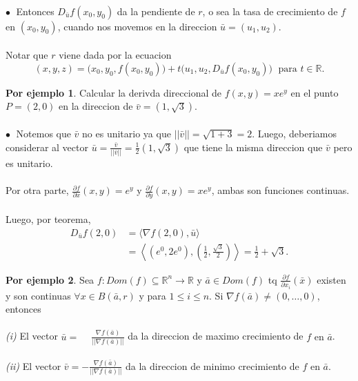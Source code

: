 \documentclass{article}
\theoremstyle{definition}
\newtheorem*{ej}{Por ejemplo}
\theoremstyle{remark}
\newcommand\bl{$\bullet\;$}
\begin{document}
\begin{figure}[h]
\centering
\def\svgwidth{1\textwidth}
\makebox[\textwidth]{
}
\end{figure} \\
\textcolor{verdep2}{\bl} Entonces $D_{\bar{u}}f(x_0,y_0)$ da la pendiente de $r$, o sea la tasa de crecimiento de $f$ en $(x_0,y_0)$, cuando nos movemos en la direccion $\bar{u}=(u_1,u_2).$ \\\\ Notar que $r$ viene dada por la ecuacion \[ 
(x,y,z)=\big(x_0,y_0,f(x_0,y_0)\big)+t\big(u_1,u_2,D_{\bar{u}}f(x_0,y_0)\big) \; \text{ para } t \in \mathbb{R}.
\] \pagebreak 
\begin{ej}
  Calcular la derivda direccional de $f(x,y)=xe^y$ en el punto $P=(2,0)$ en la direccion de $\bar{v}=(1,\sqrt{3})$.\\\\
  \textcolor{rojop2}{\bl} Notemos que $\bar{v}$ no es unitario ya que $||\bar{v}||=\sqrt{1+3}=2$. Luego, deberiamos considerar al vector $\bar{u}=\frac{\bar{v}}{||\bar{v}||}=\frac{1}{2}(1,\sqrt{3})$ que tiene la misma direccion que $\bar{v}$ pero es unitario. \\\\ Por otra parte, $\frac{\partial f}{\partial x}(x,y)=e^y$ y $\frac{\partial f}{\partial y}(x,y)=x e^y$, ambas son funciones continuas. \\\\ Luego, por teorema, $$\begin{aligned}
    D_{\bar{u}}f(2,0) & =\big\langle \nabla f(2,0),\bar{u} \big\rangle \\
                      & = \left\langle \left(e^0,2e^0\right),\left(\frac{1}{2},\frac{\sqrt{3}}{2}\right)\right\rangle = \frac{1}{2}+\sqrt{3}.
  \end{aligned}$$
\end{ej}
\begin{ej}
  Sea $f: Dom(f) \subseteq \mathbb{R}^n \to \mathbb{R}$ y $\bar{a} \in Dom(f)$ tq $\frac{\partial f}{\partial x_i}(\bar{x})$ existen y son continuas $\forall x \in B(\bar{a},r)$ y para $1 \leq i \leq n$. Si $\nabla f(\bar{a}) \neq (0,\dots,0)$, entonces \\\\
  \emph{(i)\phantom{i}} El vector $\bar{u}=\phantom{-}\frac{\nabla f(\bar{a})}{||\nabla f(\bar{a})||}$ da la direccion de maximo crecimiento de \mbox{$f \text{ en }\bar{a}$.} \\\\ 
  \emph{(ii)} El vector $\bar{v}=-\frac{\nabla f(\bar{a})}{||\nabla f(\bar{a})||}$ da la direccion de minimo crecimiento de $f$ en $\bar{a}$. \\\\
\end{ej}
\end{document}
